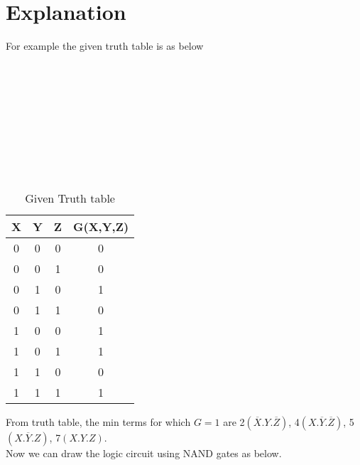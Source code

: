 \documentclass{article}
\begin{document}
\section{Explanation}
For example the given truth table is as below\\\\\\\\\\\\\\\\\\\\
\begin{table} [h!]
    \centering
    \begin{tabular}{ | c | c | c | c | }
    \hline
    X & Y & Z & G(X,Y,Z) \\
    \hline
    0 & 0 & 0 & 0 \\
    0 & 0 & 1 & 0 \\
    0 & 1 & 0 & 1 \\
    0 & 1 & 1 & 0 \\
    1 & 0 & 0 & 1 \\
    1 & 0 & 1 & 1 \\
    1 & 1 & 0 & 0 \\
    1 & 1 & 1 & 1 \\
     \hline
\end{tabular}
\caption{Given Truth table}
\label{Table1}
\end{table}
\newline
From truth table, the min terms for which $G=1$ are 2$\left(\overline{X}.Y.\overline{Z}\right)$, 4$\left(X.\overline{Y}.\overline{Z}\right)$, 5$\left(X.\overline{Y}.Z\right)$, 7$\left(X.Y.Z\right)$.\\
Now we can draw the logic circuit using NAND gates as below.\\\\\\\\\\\\\\\\\\\\\\\\\\\\\\\\\\\\\\\\\\\\\\\\\\\\\\\\\\\\
\end{document}
